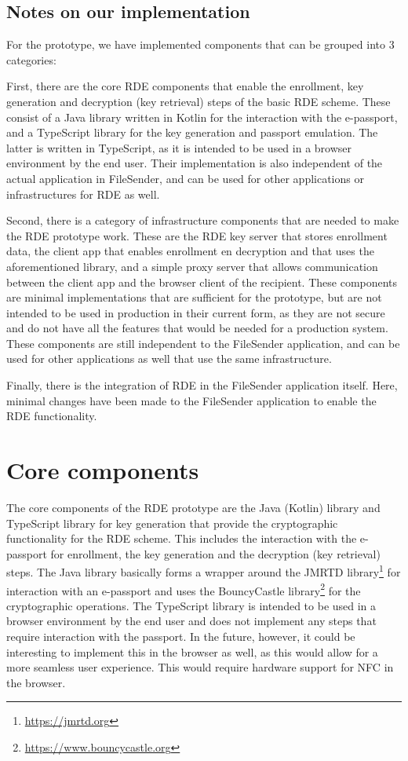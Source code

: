 \subsection{Notes on our implementation}\label{subsec:infrastructure-overview-notes-on-our-implementation}
For the prototype, we have implemented components that can be grouped into 3 categories:

First, there are the core RDE components that enable the enrollment, key generation and decryption (key retrieval) steps of the basic RDE scheme.
These consist of a Java library written in Kotlin for the interaction with the e-passport, and a TypeScript library for the key generation and passport emulation.
The latter is written in TypeScript, as it is intended to be used in a browser environment by the end user.
Their implementation is also independent of the actual application in FileSender, and can be used for other applications or infrastructures for RDE as well.

Second, there is a category of infrastructure components that are needed to make the RDE prototype work.
These are the RDE key server that stores enrollment data, the client app that enables enrollment en decryption and that uses the aforementioned library, and a simple proxy server that allows communication between the client app and the browser client of the recipient.
These components are minimal implementations that are sufficient for the prototype, but are not intended to be used in production in their current form, as they are not secure and do not have all the features that would be needed for a production system.
These components are still independent to the FileSender application, and can be used for other applications as well that use the same infrastructure.

Finally, there is the integration of RDE in the FileSender application itself.
Here, minimal changes have been made to the FileSender application to enable the RDE functionality.

\section{Core components}\label{sec:core-components}
The core components of the RDE prototype are the Java (Kotlin) library and TypeScript library for key generation that provide the cryptographic functionality for the RDE scheme.
This includes the interaction with the e-passport for enrollment, the key generation and the decryption (key retrieval) steps.
The Java library basically forms a wrapper around the JMRTD library\footnote{\url{https://jmrtd.org}} for interaction with an e-passport and uses the BouncyCastle library\footnote{\url{https://www.bouncycastle.org}} for the cryptographic operations.
The TypeScript library is intended to be used in a browser environment by the end user and does not implement any steps that require interaction with the passport.
In the future, however, it could be interesting to implement this in the browser as well, as this would allow for a more seamless user experience.
This would require hardware support for NFC in the browser.

